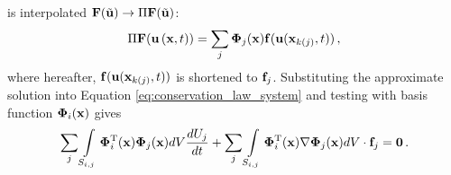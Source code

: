 is interpolated $\consfluxvector(\approximatevectorsolution) \rightarrow
\Pi\consfluxvector(\approximatevectorsolution)$:
\begin{equation}
  \Pi\consfluxvector(\vectorsolution\xt) 
    = \sumj\vectortestfunction_j(\x)\mathbf{\consfluxletter}
      (\vectorsolution(\x_{\nodeindex(j)},\timevalue))
  \eqc
\end{equation}
where hereafter, $\mathbf{f}(\mathbf{u}(\mathbf{x}_{k(j)},t))$
is shortened to $\mathbf{f}_j$.
Substituting the approximate
solution into Equation \eqref{eq:conservation_law_system} and testing with basis
function $\mathbf{\Phi}_i(\mathbf{x})$ gives
\begin{equation}
   \sum\limits_j\int\limits_{S_{i,j}}\mathbf{\Phi}_i^{\text{T}}(\mathbf{x})\mathbf{\Phi}_j(\mathbf{x}) dV
     \frac{dU_j}{dt}
     + \sum\limits_j\int\limits_{S_{i,j}}\mathbf{\Phi}_i^{\text{T}}(\mathbf{x})\nabla\mathbf{\Phi}_j(\mathbf{x})
     dV\cdot\mathbf{f}_j = \mathbf{0} \,.
\end{equation}



